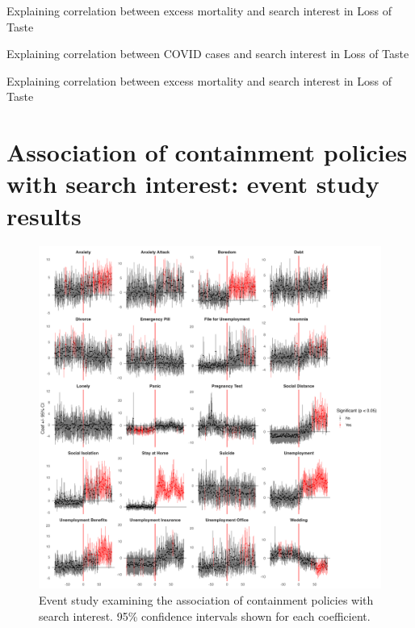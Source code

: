 \documentclass{article}
\begin{document}
\begin{table}[H]
\caption{Explaining correlation between excess mortality and search interest in Loss of Taste}
\label{tab:lm_cor_excess_monthly_loss_of_taste}
\centering

\end{table}

\begin{table}[H]
\caption{Explaining correlation between COVID cases and search interest in Loss of Taste}
\label{tab:lm_cor_cases_monthly_covid_symptoms}
\centering

\end{table}

\begin{table}[H]
\caption{Explaining correlation between excess mortality and search interest in Loss of Taste}
\label{tab:lm_cor_excess_monthly_covid_symptoms}
\centering

\end{table}

\newpage
\section{Association of containment policies with search interest: event study results}
\label{si:contain_es}

\begin{figure}[H]
    \includegraphics[width=1\textwidth]{figures/es_global_90days.png}
    \caption{Event study examining the association of containment policies with search interest. 95\% confidence intervals shown for each coefficient.}
    \label{fig:contain_es}
\end{figure}
\end{document}

